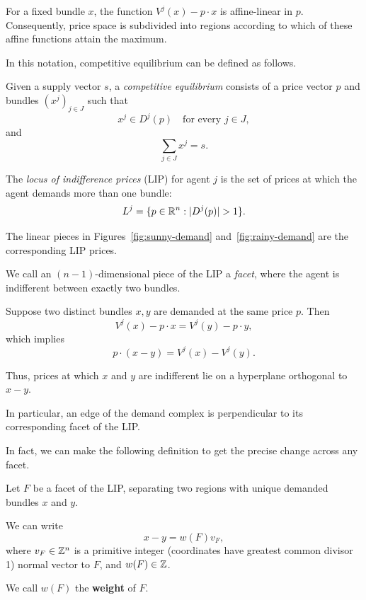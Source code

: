 \documentclass[../../main.tex]{subfiles}
\begin{document}
For a fixed bundle $x$, the function $V^j(x)-p\cdot x$ is affine-linear in 
$p$. Consequently, price space is subdivided into regions according to which
of these affine functions attain the maximum.

In this notation, competitive equilibrium can be defined as follows.

\begin{defin}
    Given a supply vector $s$, a \textit{competitive equilibrium} consists of
    a price vector $p$ and bundles $(x^j)_{j\in J}$ such that
    \[
        x^j \in D^j(p) \quad\text{for every } j \in J,
    \]
    and
    \[
        \sum_{j \in J}x^j=s.
    \]
\end{defin}

\begin{defin}
    The \textit{locus of indifference prices} (LIP) for agent $j$ is the set
    of prices at which the agent demands more than one bundle:
    \[
        L^j = \{p \in \rr^n : |D^j(p)|>1\}.
    \]

    The linear pieces in Figures~\ref{fig:sunny-demand}
    and~\ref{fig:rainy-demand} are the corresponding LIP prices.

    We call an $(n-1)$-dimensional piece of the LIP a \textit{facet}, where the agent is indifferent between exactly two bundles.
\end{defin}

Suppose two distinct bundles $x,y$ are demanded at the same
price $p$. Then
\[
    V^j(x)-p\cdot x=V^j(y)-p\cdot y,
\]
which implies
\[
    p\cdot(x-y)=V^j(x)-V^j(y).
\]

Thus, prices at which $x$ and $y$ are indifferent lie
on a hyperplane orthogonal to $x-y$.

In particular, an edge of the demand complex is
perpendicular to its corresponding facet of the LIP.

In fact, we can make the following definition to get the precise change across any facet.

\begin{defin}
    Let $F$ be a facet of the LIP, separating two
    regions with unique demanded bundles $x$ and $y$.

    We can write
    \[
        x-y = w(F)v_F,
    \]
    where $v_F\in\mathbb{Z}^n$ is a primitive integer 
    (coordinates have greatest common divisor 1)
    normal vector to $F$, and $w(F)\in\mathbb{Z}$.

    We call $w(F)$ the \textbf{weight} of $F$.
\end{defin}
\end{document}
